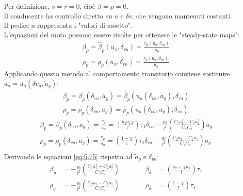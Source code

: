 Per definizione, \(\dot{v} = \dot{r} = 0\), cioè \(\beta = \rho = 0\).\\ 
Il conducente ha controllo diretto su \(u\) e \(\delta v\), che vengono mantenuti costanti.\\
Il pedice \(a\) rappresenta i "valori di assetto".\\
L'equazioni del moto possono essere risolte per ottenere le "steady-state maps":\\
\begin{equation} 
  \begin{split}
     \beta_p = \hat{\beta}_p(u_a, \delta_{va}) = \frac{v_p(u_a, \delta_{va})} {u_a} \\
     \rho_p = \hat{\rho}_p(u_a, \delta_{va}) = \frac{r_p(u_a, \delta_{va})} {u_a}
  \end{split}
\end{equation}
Applicando questo metodo al comportamento transitorio conviene sostituire $u_a = u_a(\delta v_a, \tilde{a}_y)$:
\begin{equation} 
  \begin{split}
     \beta_p = \beta_p(\delta_{va}, \tilde{a}_y) = \hat{\beta}_p(u_a(\delta_{va}, \tilde{a}_y), \delta_{va}) \\
     \rho_p = \rho_p(\delta_{va}, \tilde{a}_y) = \hat{\rho}_p(u_a(\delta_{va}, \tilde{a}_y), \delta_{va})
  \end{split}
\end{equation}
\begin{equation} \label{eq:5.75}
  \begin{split}
     \beta_p = \beta_p(\delta_{va}, \tilde{a}_y) = \frac{v_p}{u_a} = (\frac{a_2 a_1\chi}{l})\tau_1 \delta_{va} - \frac{m}{l^2} (\frac{C_1a_1^2+C_2a_2^2}{C_1C_2})\tilde{a}_y\\
     \rho_p = \rho_p(\delta_{va}, \tilde{a}_y) = \frac{r_p}{u_a} = (\frac{1-\chi}{l})\tau_1 \delta_{va} - \frac{m}{l^2} (\frac{C_2a_2-C_1a_1}{C_1C_2})\tilde{a}_y\\
  \end{split}
\end{equation}
Derivando le equazioni \ref{eq:5.75} rispetto ad $\tilde{a}_y$ e $\delta_{va}$:
\begin{align}
     \beta_y & =- \frac{m}{l^2} (\frac{C_1a_1^2+C_2a_2^2}{C_1C_2}) \qquad \quad &  \beta_{\delta} & =(\frac{a_2 +\chi a_1}{l})\tau_1 \\
     \rho_y & = - \frac{m}{l^2} (\frac{C_2a_2-C_1a_1}{C_1C_2}) \qquad \quad &  \rho_{\delta} & = (\frac{1-\chi}{l})\tau_1
\end{align}
